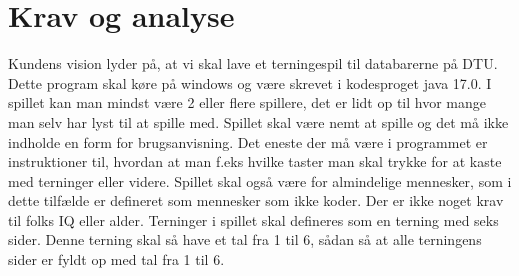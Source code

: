 \section{Krav og analyse}
\Large Kundens vision lyder på, at vi skal lave et terningespil til databarerne på DTU. Dette program skal køre på windows og være skrevet i kodesproget java 17.0. I spillet kan man mindst være 2 eller flere spillere, det er lidt op til hvor mange man selv har lyst til at spille med. Spillet skal være nemt at spille og det må ikke indholde en form for brugsanvisning. Det eneste der må være i programmet er instruktioner til, hvordan at man f.eks hvilke taster man skal trykke for at kaste med terninger eller videre. Spillet skal også være for almindelige mennesker, som i dette tilfælde er defineret som mennesker som ikke koder. Der er ikke noget krav til folks IQ eller alder. Terninger i spillet skal defineres som en terning med seks sider. Denne terning skal så have et tal fra 1 til 6, sådan så at alle terningens sider er fyldt op med tal fra 1 til 6. 
